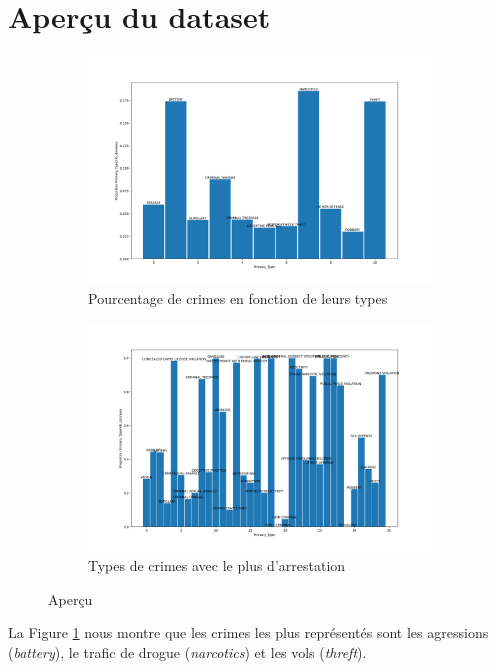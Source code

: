 \documentclass{article}
\begin{document}
    \section{Aperçu du dataset}
    \begin{figure}[H]
	    \centering
	    \begin{subfigure}{.45\textwidth}
		    \includegraphics[scale=.2]{images/pprimarytype.png}
		    \caption{Pourcentage de crimes en fonction de leurs types}
		    \label{A}
	    \end{subfigure}
	    \begin{subfigure}{.45\textwidth}
		    \includegraphics[scale=.2]{images/typeArrestation.png}
		    \caption{Types de crimes avec le plus d'arrestation}
		    \label{B}
	    \end{subfigure}
	    \caption{Aperçu }
    \end{figure}
    La Figure \ref{A} nous montre que les crimes les plus représentés sont les 
    agressions (\textit{battery}), le trafic de drogue (\textit{narcotics}) 
    et les vols (\textit{threft}).
\end{document}
